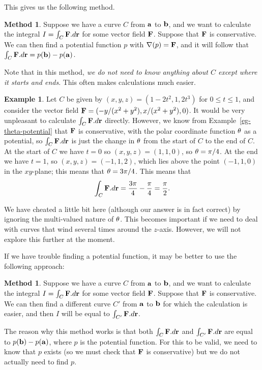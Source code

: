 \documentclass[reqno]{amsart}
\theoremstyle{definition}
\newtheorem{example}[theorem]{Example}
\newtheorem{method}[theorem]{Method}
\begin{document}
This gives us the following method.
\begin{method}\label{meth-potential-change}
 Suppose we have a curve $C$ from $\mathbf{a}$ to $\mathbf{b}$, and we want to
 calculate the integral $I=\int_C\mathbf{F}.d\mathbf{r}$ for some vector field $\mathbf{F}$.
 Suppose that $\mathbf{F}$ is conservative.  We can then find a potential
 function $p$ with $\nabla(p)=\mathbf{F}$, and it will follow that
 $\int_C\mathbf{F}.d\mathbf{r}=p(\mathbf{b})-p(\mathbf{a})$.  
\end{method}
Note that in this method, \emph{we do not need to know anything about
 $C$ except where it starts and ends}.  This often makes calculations
much easier.
\begin{example}\label{eg-potential-change}
 Let $C$ be given by $(x,y,z)=(1-2t^2,1,2t^3)$ for $0\leq t\leq 1$, and
 consider the vector field $\mathbf{F}=(-y/(x^2+y^2),x/(x^2+y^2),0)$.  It
 would be very unpleasant to calculate $\int_C\mathbf{F}.d\mathbf{r}$ directly.
 However, we know from Example~\ref{eg-theta-potential} that $\mathbf{F}$ is
 conservative, with the polar coordinate function $\theta$ as a
 potential, so $\int_C\mathbf{F}.d\mathbf{r}$ is just the change in $\theta$ from the
 start of $C$ to the end of $C$.  At the start of $C$ we have $t=0$ so
 $(x,y,z)=(1,1,0)$, so $\theta=\pi/4$.  At the end we have $t=1$, so
 $(x,y,z)=(-1,1,2)$, which lies above the point $(-1,1,0)$ in the
 $xy$-plane; this means that $\theta=3\pi/4$.  This means that
 \[ \int_C\mathbf{F}.d\mathbf{r} = \frac{3\pi}{4} - \frac{\pi}{4} = \frac{\pi}{2}. \]

 We have cheated a little bit here (although our answer is in fact
 correct) by ignoring the multi-valued nature of $\theta$.   This
 becomes important if we need to deal with curves that wind several
 times around the $z$-axis.  However, we will not explore this further
 at the moment.
\end{example}

If we have trouble finding a potential function, it may be better to
use the following approach:
\begin{method}\label{meth-simpler-path}
 Suppose we have a curve $C$ from $\mathbf{a}$ to $\mathbf{b}$, and we want to
 calculate the integral $I=\int_C\mathbf{F}.d\mathbf{r}$ for some vector field $\mathbf{F}$.
 Suppose that $\mathbf{F}$ is conservative.  We can then find a different
 curve $C'$ from $\mathbf{a}$ to $\mathbf{b}$ for which the calculation is easier,
 and then $I$ will be equal to $\int_{C'}\mathbf{F}.d\mathbf{r}$.
\end{method}
The reason why this method works is that both $\int_C\mathbf{F}.d\mathbf{r}$ and
$\int_{C'}\mathbf{F}.d\mathbf{r}$ are equal to $p(\mathbf{b})-p(\mathbf{a})$, where $p$ is the
potential function.  For this to be valid, we need to know that $p$
exists (so we must check that $\mathbf{F}$ is conservative) but we do not
actually need to find $p$.
\end{document}
